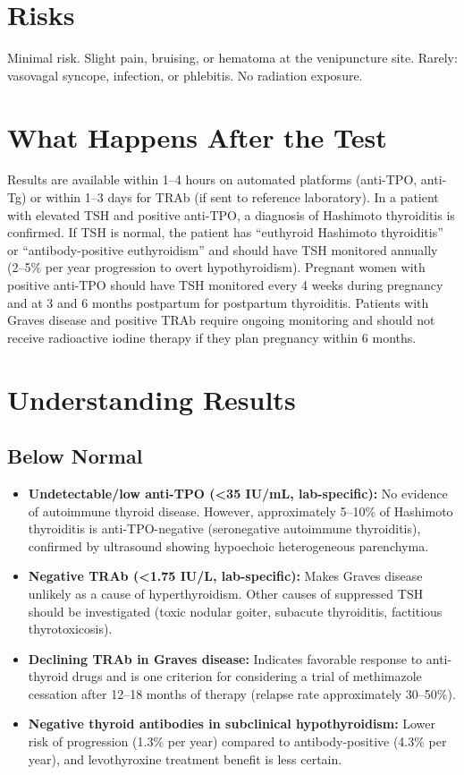 \section*{Risks}
Minimal risk. Slight pain, bruising, or hematoma at the venipuncture site. Rarely: vasovagal syncope, infection, or phlebitis. No radiation exposure.

\section*{What Happens After the Test}
Results are available within 1--4 hours on automated platforms (anti-TPO, anti-Tg) or within 1--3 days for TRAb (if sent to reference laboratory). In a patient with elevated TSH and positive anti-TPO, a diagnosis of Hashimoto thyroiditis is confirmed. If TSH is normal, the patient has ``euthyroid Hashimoto thyroiditis'' or ``antibody-positive euthyroidism'' and should have TSH monitored annually (2--5\% per year progression to overt hypothyroidism). Pregnant women with positive anti-TPO should have TSH monitored every 4 weeks during pregnancy and at 3 and 6 months postpartum for postpartum thyroiditis. Patients with Graves disease and positive TRAb require ongoing monitoring and should not receive radioactive iodine therapy if they plan pregnancy within 6 months.

\section*{Understanding Results}

\subsection*{Below Normal}
\begin{itemize}
  \item \textbf{Undetectable/low anti-TPO (<35 IU/mL, lab-specific):} No evidence of autoimmune thyroid disease. However, approximately 5--10\% of Hashimoto thyroiditis is anti-TPO-negative (seronegative autoimmune thyroiditis), confirmed by ultrasound showing hypoechoic heterogeneous parenchyma.
  \item \textbf{Negative TRAb (<1.75 IU/L, lab-specific):} Makes Graves disease unlikely as a cause of hyperthyroidism. Other causes of suppressed TSH should be investigated (toxic nodular goiter, subacute thyroiditis, factitious thyrotoxicosis).
  \item \textbf{Declining TRAb in Graves disease:} Indicates favorable response to anti-thyroid drugs and is one criterion for considering a trial of methimazole cessation after 12--18 months of therapy (relapse rate approximately 30--50\%).
  \item \textbf{Negative thyroid antibodies in subclinical hypothyroidism:} Lower risk of progression (1.3\% per year) compared to antibody-positive (4.3\% per year), and levothyroxine treatment benefit is less certain.
\end{itemize}

